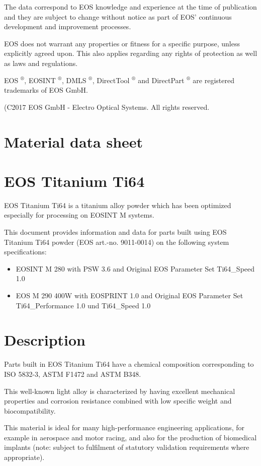 \documentclass[10pt]{article}
\begin{document}
The data correspond to EOS knowledge and experience at the time of publication and they are subject to change without notice as part of EOS' continuous development and improvement processes.

EOS does not warrant any properties or fitness for a specific purpose, unless explicitly agreed upon. This also applies regarding any rights of protection as well as laws and regulations.

EOS $^{\circledR}$, EOSINT $^{\circledR}$, DMLS $^{\circledR}$, DirectTool $^{\circledR}$ and DirectPart ${ }^{\circledR}$ are registered trademarks of EOS GmbH.

(C2017 EOS GmbH - Electro Optical Systems. All rights reserved.

\section*{Material data sheet}
\section*{EOS Titanium Ti64}
EOS Titanium Ti64 is a titanium alloy powder which has been optimized especially for processing on EOSINT M systems.

This document provides information and data for parts built using EOS Titanium Ti64 powder (EOS art.-no. 9011-0014) on the following system specifications:

\begin{itemize}
  \item EOSINT M 280 with PSW 3.6 and Original EOS Parameter Set Ti64\_Speed 1.0
  \item EOS M 290 400W with EOSPRINT 1.0 and Original EOS Parameter Set Ti64\_Performance 1.0 und Ti64\_Speed 1.0
\end{itemize}

\section*{Description}
Parts built in EOS Titanium Ti64 have a chemical composition corresponding to ISO 5832-3, ASTM F1472 and ASTM B348.

This well-known light alloy is characterized by having excellent mechanical properties and corrosion resistance combined with low specific weight and biocompatibility.

This material is ideal for many high-performance engineering applications, for example in aerospace and motor racing, and also for the production of biomedical implants (note: subject to fulfilment of statutory validation requirements where appropriate).
\end{document}
